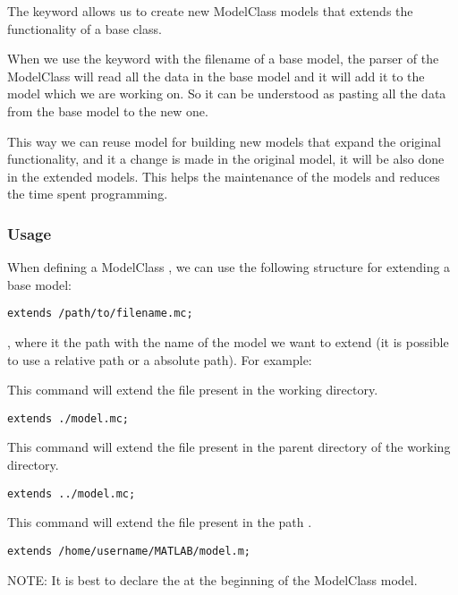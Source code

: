 \documentclass[11pt]{article}
\begin{document}
The keyword  allows us to create new ModelClass models that extends the functionality of a base class.

When we use the keyword  with the filename of a base model, the parser of the ModelClass will read all the data in the base model and it will add it to the model which we are working on. So it can be understood as pasting all the data from the base model to the new one.

This way we can reuse model for building new models that expand the original functionality, and it a change is made in the original model, it will be also done in the extended models. This helps the maintenance of the models and reduces the time spent programming.

\subsubsection{Usage}

When defining a ModelClass , we can use the following structure for extending a base model:

\begin{lstlisting}
extends /path/to/filename.mc;
\end{lstlisting}

, where  it the path with the name of the model we want to extend (it is possible to use a relative path or a absolute path). For example:

This command will extend the file  present in the working directory.

\begin{lstlisting}
extends ./model.mc;
\end{lstlisting}

This command will extend the file  present in the parent directory of the working directory.

\begin{lstlisting}
extends ../model.mc;
\end{lstlisting}

This command will extend the file  present in the path .

\begin{lstlisting}
extends /home/username/MATLAB/model.m;
\end{lstlisting}

NOTE: It is best to declare the  at the beginning of the ModelClass model.
\end{document}
